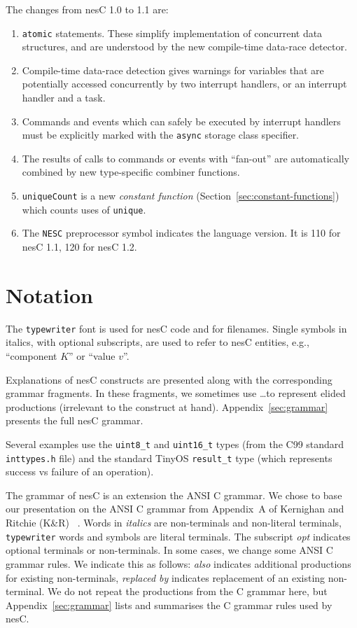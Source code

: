 \documentclass[11pt,letterpaper]{article}
\newcommand{\kw}[1]{{\tt #1}}
\newcommand{\code}[1]{{\tt #1}}
\newcommand{\file}[1]{{\tt #1}}
\newcommand{\nesc}{nesC\xspace}
\begin{document}
The changes from \nesc 1.0 to 1.1 are:
\begin{enumerate}
\item \kw{atomic} statements. These simplify implementation of concurrent
data structures, and are understood by the new compile-time data-race
detector.

\item Compile-time data-race detection gives warnings for variables that
are potentially accessed concurrently by two interrupt handlers, or an
interrupt handler and a task.

\item Commands and events which can safely be executed by interrupt
handlers must be explicitly marked with the \kw{async} storage class
specifier.

\item The results of calls to commands or events with ``fan-out'' are
automatically combined by new type-specific combiner functions.

\item \code{uniqueCount} is a new \emph{constant function}
(Section~\ref{sec:constant-functions}) which counts uses of \code{unique}.

\item The \kw{NESC} preprocessor symbol indicates the language version. It
is 110 for \nesc 1.1, 120 for \nesc 1.2.
 
\end{enumerate}

\section{Notation}
\label{sec:notation}

The \texttt{typewriter} font is used for \nesc code and for
filenames. Single symbols in italics, with optional subscripts, are used to
refer to \nesc entities, e.g., ``component $K$'' or ``value $v$''.

Explanations of \nesc constructs are presented along with the corresponding
grammar fragments. In these fragments, we sometimes use \ldots to represent
elided productions (irrelevant to the construct at
hand). Appendix~\ref{sec:grammar} presents the full \nesc grammar.

Several examples use the \code{uint8\_t} and \code{uint16\_t} types (from
the C99 standard \file{inttypes.h} file) and the standard TinyOS
\code{result\_t} type (which represents success vs failure of an operation).

The grammar of \nesc is an extension the ANSI C grammar. We chose to base
our presentation on the ANSI C grammar from Appendix~A of Kernighan and
Ritchie (K\&R) ~\cite[pp234--239]{kandr}. Words in \emph{italics} are
non-terminals and non-literal terminals, \kw{typewriter} words and symbols
are literal terminals. The subscript \emph{opt} indicates optional
terminals or non-terminals. In some cases, we change some ANSI C grammar
rules. We indicate this as follows: \emph{also} indicates additional
productions for existing non-terminals, \emph{replaced by} indicates
replacement of an existing non-terminal. We do not repeat the productions
from the C grammar here, but Appendix~\ref{sec:grammar} lists and 
summarises the C grammar rules used by \nesc.
\end{document}
